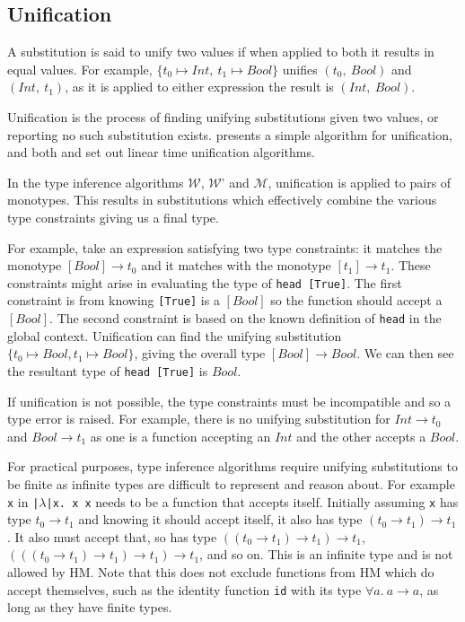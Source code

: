 \documentclass[a4paper,fleqn,oneside,12pt]{report}
\newcommand{\W}{$\mathcal{W}$}
\newcommand{\M}{$\mathcal{M}$}
\begin{document}
\subsection{Unification}

A substitution is said to unify two values if when applied to both it results in equal values. For example, $\{ t_0 \mapsto Int,\ t_1 \mapsto Bool \}$ unifies $(t_0,\ Bool)$ and $(Int,\ t_1)$, as it is applied to either expression the result is $(Int,\ Bool)$.

Unification is the process of finding unifying substitutions given two values, or reporting no such substitution exists. \cite{ref29} presents a simple algorithm for unification, and both \cite{ref30} and \cite{ref31} set out linear time unification algorithms.

In the type inference algorithms \W, \W’ and \M, unification is applied to pairs of monotypes. This results in substitutions which effectively combine the various type constraints giving us a final type.

For example, take an expression satisfying two type constraints: it matches the monotype $[Bool] \rightarrow t_0$ and it matches with the monotype $[t_1] \rightarrow t_1$. These constraints might arise in evaluating the type of \texttt{head [True]}. The first constraint is from knowing \texttt{[True]} is a $[Bool]$ so the function should accept a $[Bool]$. The second constraint is based on the known definition of \texttt{head} in the global context. Unification can find the unifying substitution $\{ t_0 \mapsto Bool, t_1 \mapsto Bool \}$, giving the overall type $[Bool] \rightarrow Bool$. We can then see the resultant type of \texttt{head [True]} is $Bool$.

If unification is not possible, the type constraints must be incompatible and so a type error is raised. For example, there is no unifying substitution for $Int \rightarrow t_0$ and $Bool \rightarrow t_1$ as one is a function accepting an $Int$ and the other accepts a $Bool$.

For practical purposes, type inference algorithms require unifying substitutions to be finite as infinite types are difficult to represent and reason about. For example \texttt{x} in \texttt{|$\lambda$|x. x x} needs to be a function that accepts itself. Initially assuming \texttt{x} has type $t_0 \rightarrow t_1$ and knowing it should accept itself, it also has type $(t_0 \rightarrow t_1) \rightarrow t_1$. It also must accept that, so has type $((t_0 \rightarrow t_1) \rightarrow t_1) \rightarrow t_1$, $(((t_0 \rightarrow t_1) \rightarrow t_1) \rightarrow t_1) \rightarrow t_1$, and so on. This is an infinite type and is not allowed by HM. Note that this does not exclude functions from HM which do accept themselves, such as the identity function \texttt{id} with its type $\forall a.\ a \rightarrow a$, as long as they have finite types.
\end{document}
